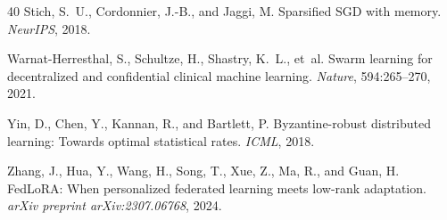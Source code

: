 \begin{thebibliography}{40}
Stich, S.~U., Cordonnier, J.-B., and Jaggi, M.
\newblock Sparsified SGD with memory.
\newblock \emph{NeurIPS}, 2018.

Warnat-Herresthal, S., Schultze, H., Shastry, K.~L., et~al.
\newblock Swarm learning for decentralized and confidential clinical machine
  learning.
\newblock \emph{Nature}, 594:265--270, 2021.

Yin, D., Chen, Y., Kannan, R., and Bartlett, P.
\newblock Byzantine-robust distributed learning: Towards optimal statistical
  rates.
\newblock \emph{ICML}, 2018.

Zhang, J., Hua, Y., Wang, H., Song, T., Xue, Z., Ma, R., and Guan, H.
\newblock FedLoRA: When personalized federated learning meets low-rank
  adaptation.
\newblock \emph{arXiv preprint arXiv:2307.06768}, 2024.

\end{thebibliography}

